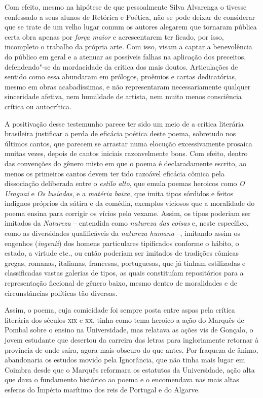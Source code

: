 Com efeito, mesmo na hipótese de que pessoalmente Silva Alvarenga o tivesse
confessado a seus alunos de Retórica e Poética, não se pode deixar de considerar
que se trate de um velho lugar comum os autores alegarem que tornaram pública
certa obra apenas por \textit{força maior} e acrescentarem ter ficado, por isso,
incompleto o trabalho da própria arte. Com isso, visam a captar a benevolência
do público em geral e a atenuar as possíveis falhas na aplicação dos preceitos,
defendendo"-se da mordacidade da crítica dos mais doutos.  Articulações de
sentido como essa abundaram em prólogos, proêmios e cartas dedicatórias, mesmo
em obras acabadíssimas, e não representaram necessariamente qualquer sinceridade
afetiva, nem humildade de artista, nem muito menos consciência crítica ou
autocrítica.

A positivação desse testemunho parece ter sido um meio de a crítica literária
brasileira justificar a perda de eficácia poética deste poema, sobretudo nos
últimos cantos, que parecem se arrastar numa elocução excessivamente prosaica
muitas vezes, depois de cantos iniciais razoavelmente bons.  Com efeito, dentro
das convenções do gênero misto em que o poema é declaradamente escrito, ao menos
os primeiros cantos devem ter tido razoável eficácia cômica pela dissociação
deliberada entre o \textit{estilo alto}, que emula poemas heroicos como
\textit{O Uraguai} e \textit{Os lusíadas}, e a \textit{matéria baixa}, que imita
tipos sórdidos e feitos indignos próprios da sátira e da comédia, exemplos
viciosos que a moralidade do poema ensina para corrigir os vícios pelo vexame.
Assim, os tipos poderiam ser imitados da \textit{Natureza} -- entendida como
\textit{natureza das coisas} e, neste específico, como as diversidades
qualificáveis da \textit{natureza humana} --, imitando assim os engenhos
(\textit{ingenii}) dos homens particulares tipificados conforme o hábito, o
estado, a virtude etc., ou então poderiam ser imitados de tradições cômicas
gregas, romanas, italianas, francesas, portuguesas, que já tinham estilizadas e
classificadas vastas galerias de tipos, as quais constituíam repositórios para a
representação ficcional de gênero baixo, mesmo dentro de moralidades e de
circunstâncias políticas tão diversas.

Assim, o poema, cuja comicidade foi sempre posta entre aspas pela crítica
literária dos séculos \textsc{xix} e \textsc{xx}, tinha como tema heroico a ação do Marquês de
Pombal sobre o ensino na Universidade, mas relatava as ações vis de Gonçalo, o
jovem estudante que desertou da carreira das letras para ingloriamente retornar
à província de onde saíra, agora mais obscuro do que antes.  Por fraqueza de
ânimo, abandonaria os estudos movido pela Ignorância, que não tinha mais lugar
em Coimbra desde que o Marquês reformara os estatutos da Universidade, ação alta
que dava o fundamento histórico ao poema e o encomendava nas mais altas esferas
do Império marítimo dos reis de Portugal e do Algarve.

